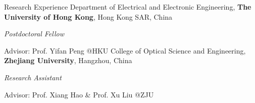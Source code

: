 \begin{rubric}{Research Experience}
	\entry*[2024/04 -- Present]%
	Department of Electrical and Electronic Engineering, \textbf{The University of Hong Kong}, Hong Kong SAR, China
	\par \textit{Postdoctoral Fellow}
	\par Advisor: Prof. Yifan Peng @HKU
    \entry*[2024/01 -- 2024/03]%
	College of Optical Science and Engineering, \textbf{Zhejiang University}, Hangzhou, China
	\par \textit{Research Assistant}
	\par Advisor: Prof. Xiang Hao \& Prof. Xu Liu @ZJU
\end{rubric}
